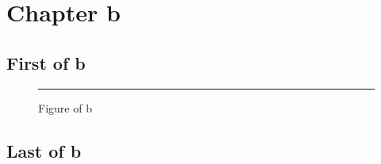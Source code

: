 \chapter{Chapter b}
\section{First of b}
\lipsum[1-3]
\begin{figure}[h]\centering\rule{2cm}{1cm}\caption{Figure of b}\end{figure}
\section{Last of b}\label{last-b}
\lipsum[4-6]
